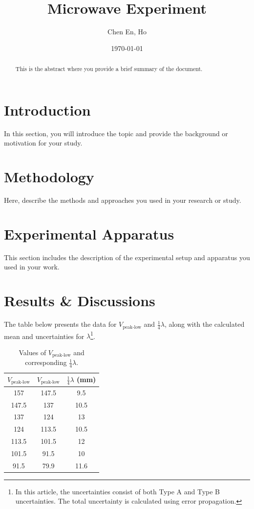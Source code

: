 \documentclass{article}
\title{Microwave Experiment}
\author{Chen En, Ho}
\date{\today}
\begin{document}
\maketitle

\begin{abstract}
This is the abstract where you provide a brief summary of the document.
\end{abstract}

\section{Introduction}
In this section, you will introduce the topic and provide the background or motivation for your study.

\section{Methodology}
Here, describe the methods and approaches you used in your research or study.

\section{Experimental Apparatus}
This section includes the description of the experimental setup and apparatus you used in your work.

\section{Results \& Discussions}



The table below presents the data for \( V_{\text{peak-low}} \) and \( \frac{1}{4} \lambda \), along with the calculated mean and uncertainties for \( \lambda \)\footnote{In this article, the uncertainties consist of both Type A and Type B uncertainties. The total uncertainty is calculated using error propagation.}.

\begin{table}[H]
    \centering
    \begin{tabular}{|c|c|c|}
        \hline
        \( V_{\text{peak-low}} \) & \( V_{\text{peak-low}} \) & \( \frac{1}{4} \lambda \) (mm) \\
        \hline
        157 & 147.5 & 9.5 \\
        147.5 & 137 & 10.5 \\
        137 & 124 & 13 \\
        124 & 113.5 & 10.5 \\
        113.5 & 101.5 & 12 \\
        101.5 & 91.5 & 10 \\
        91.5 & 79.9 & 11.6 \\
        \hline
    \end{tabular}
    \caption{Values of \( V_{\text{peak-low}} \) and corresponding \( \frac{1}{4} \lambda \).}
\end{table}
\end{document}
